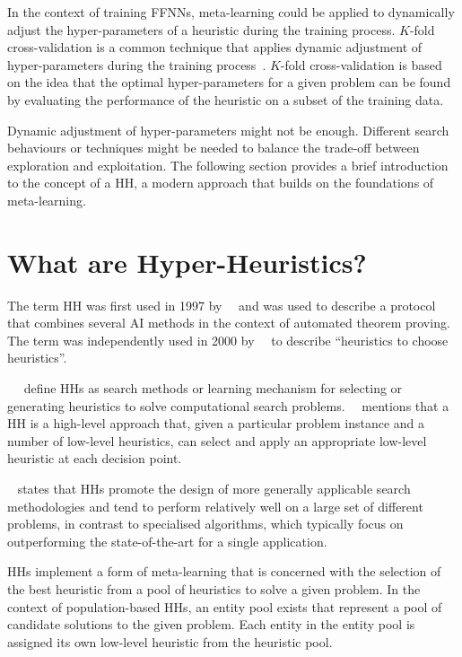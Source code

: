 In the context of training \acp{FFNN}, meta-learning could be applied to dynamically adjust the hyper-parameters of a heuristic during the training process. $K$-fold cross-validation is a common technique that applies dynamic adjustment of hyper-parameters during the training process~\cite{ref:allen:1974}. $K$-fold cross-validation is based on the idea that the optimal hyper-parameters for a given problem can be found by evaluating the performance of the heuristic on a subset of the training data.

Dynamic adjustment of hyper-parameters might not be enough. Different search behaviours or techniques might be needed to balance the trade-off between exploration and exploitation. The following section provides a brief introduction to the concept of a \acf{HH}, a modern approach that builds on the foundations of meta-learning.


\section{What are Hyper-Heuristics?}
\label{sec:hh:what_is_a_hh}

The term \acf{HH} was first used in 1997 by~\citeauthor{ref:burke:2010}~\cite{ref:burke:2010} and was used to describe a protocol that combines several \acs{AI} methods in the context of automated theorem proving. The term was independently used in 2000 by~\citeauthor{ref:cowling:2000}~\cite{ref:cowling:2000} to describe ``heuristics to choose heuristics''.

~\citeauthor{ref:burke:2010}~\cite{ref:burke:2010} define \acp{HH} as search methods or learning mechanism for selecting or generating heuristics to solve computational search problems.~\citeauthor{ref:burke:2003}~\cite{ref:burke:2003} mentions that a \acs{HH} is a high-level approach that, given a particular problem instance and a number of low-level heuristics, can select and apply an appropriate low-level heuristic at each decision point.

\citeauthor{ref:grobler:2015}~\cite{ref:grobler:2015} states that \acp{HH} promote the design of more generally applicable search methodologies and tend to perform relatively well on a large set of different problems, in contrast to specialised algorithms, which typically focus on outperforming the state-of-the-art for a single application.

\acp{HH} implement a form of meta-learning that is concerned with the selection of the best heuristic from a pool of heuristics to solve a given problem. In the context of population-based \acp{HH}, an entity pool exists that represent a pool of candidate solutions to the given problem. Each entity in the entity pool is assigned its own low-level heuristic from the heuristic pool.

